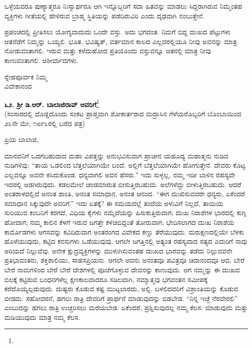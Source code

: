 ಒಳ್ಳೆಯವರೂ ಪುಣ್ಯಾತ್ಮರೂ ನಿಃಸ್ವಾರ್ಥರೂ ಆಗಿ ಇನ್ನೊಬ್ಬರಿಗೆ ಸದಾ ಹಿತವನ್ನು ಮಾಡಲು ಸಿದ್ದರಾಗಿರುವ ನಿಮ್ಮಂತಹ ವ್ಯಕ್ತಿಗಳು ಗೀತೆಯಲ್ಲಿ ಹೇಳಿರುವ ಬ್ರಾಹ್ಮ ಸ್ಥಿತಿಯನ್ನು ಪಡೆದಿರುವಿರಿ ಎಂದು ದೃಢವಾಗಿ ನಂಬುತ್ತೇನೆ.

ಪ್ರಪಂಚದಲ್ಲಿ ಪ್ರೀತಿಸಲು ಯೋಗ್ಯವಾದುದು ಒಂದೇ ವಸ್ತು. ಅದು ಭಗವಂತ. ನಿಮಗೆ ಬಿದ್ದ ದುಃಖದ ಪೆಟ್ಟುಗಳು ಆತನೆಡೆಗೆ ನಿಮ್ಮನ್ನು ಒಯ್ಯಲಿ. ಭೂತ, ಭವಿಷ್ಯತ್, ವರ್ತಮಾನ ಕಾಲದ ಎಲ್ಲದರಲ್ಲಿಯೂ ನೀವು ಅವನನ್ನು ಮಾತ್ರ ನೋಡುವಂತಾಗಲಿ. ಇರುವ ಮತ್ತು ಕಳೆದುಹೋದ ಪ್ರತಿಯೊಂದು ವಸ್ತುವನ್ನೂ ಆತನಲ್ಲಿ ಮಾತ್ರ ನೀವು ಕಾಣುವಂತಾಗಲಿ. ಆಶೀರ್ವಾದಗಳು.

{\flushright
ಸ್ನೇಹಪೂರ್ವಕ ನಿಮ್ಮ\\ವಿವೇಕಾನಂದ\par}

\newpage

\begin{center}
\textbf{೬೨. ಶ‍್ರೀ ಡಿ.ಆರ್. ಬಾಲಾಜಿರಾವ್ ಅವರಿಗೆ}\footnote{}\\ (ಸಂಸಾರದಲ್ಲಿ ದೊಡ್ಡದೊಂದು ಸಂಕಟ ಪ್ರಾಪ್ತವಾಗಿ ಶೋಕಾರ್ತರಾದ ಮದ್ರಾಸಿನ ಗೆಳೆಯರೊಬ್ಬರಿಗೆ ಬೊಂಬಾಯಿಂದ ೨೩ನೇ ಮೇ, ೧೮೯೩ರಲ್ಲಿ ಬರೆದ ಪತ್ರ)
\end{center}

ಪ್ರಿಯ ಬಾಲಾಜಿ,

ಮಾನವನಿಗೆ ಒದಗಬಹುದಾದ ಮಹಾ ವಿಪತ್ತನ್ನು ಅನುಭವಿಸುವಾಗ ಪ್ರಾಚೀನ ಯಹೂದ್ಯ ಮಹಾತ್ಮನು ನುಡಿದ ನುಡಿಗಳಿವು: ``ತಾಯ ಒಡಲಿಂದ ಬೆತ್ತಲೆಯಾಗಿಯೇ ಬಂದೆ. ಅಲ್ಲಿಗೆ ಬೆತ್ತಲೆಯಾಗಿಯೇ ಹೋಗುತ್ತೇನೆ. ದೇವರು ಕೊಟ್ಟ ಎಲ್ಲವನ್ನೂ ಅವನೇ ಕಸಿದುಕೊಂಡ. ಧನ್ಯವಾಗಲಿ ಅವನ ಹೆಸರು." ಇದು ಸುಳ್ಳಲ್ಲ, ನಮ್ಮ ಇಡೀ ಬಾಳಿನ ರಹಸ್ಯವೇ ಇದರಲ್ಲಿ ಅಡಗಿರುವುದು. ಕಡಲಮೇಲೆ ಚಂಡಮಾರುತ ಬೀಸುತ್ತಿರಬಹುದು. ಅಲೆಗಳೆದ್ದು ಬೀಳುತ್ತಿರಬಹುದು. ಆದರೆ ಅಂತರಾಳದಲ್ಲಿದೆ ಅನಂತ ಶಾಂತಿ, ಅನಂತ ಸಮಾಧಾನ, ಅನಂತ ಆನಂದ. ``ಈಗ ದುಃಖಿಸುವವರೇ ಧನ್ಯರು, ಏಕೆಂದರೆ ಸಮಾಧಾನ ಸಿಕ್ಕುವುದೇ ಅವರಿಗೆ.'' ಇದು ಏತಕ್ಕೆ? ಈ ಸಮಯದಲ್ಲೆ \enginline{-} ತಂದೆಯ ಅಳುವಿಗೆ ನಿಲ್ಲದೆ, ತಾಯಿಯ ಸುರಿಯುವ ಕಂಬನಿಗೆ ಕರಗದೆ, ವಿಧಿಯ ಕೈಗಳು ನಮ್ಮೆದೆಯನ್ನು ಹಿಸುಕುತ್ತಿರುವಾಗ; ದುಃಖ ನಿರಾಶೆಗಳ ಭಾರದಲ್ಲಿ ಕುಗ್ಗಿ ಹೋದಾಗ; ನಮ್ಮ ಕಾಲಿನ ಕೆಳಗೆ ಇರುವ ಜಗತ್ತೇ ಕಳಚಿಬಿದ್ದಂತೆ ತೋರುವಾಗ; ಭೇದಿಸಲಾಗದ ದುಃಖ ನಿರಾಶೆಯ ಕಾರ್ಮೊಡಗಳು ಆಗಸವನ್ನು ಕವಿದಿರುವಾಗ \enginline{-} ಅಂತರಂಗದ ವಿವೇಕದ ಕಣ್ಣು ತೆರೆಯುವುದು. ಮರುಕ್ಷಣದಲ್ಲಿಯೇ ಬೆಳಕು ಹೊಳೆಯುವುದು, ಕಟ್ಟಿದ ಕನಸುಗಳು ಒಡೆಯುವುವು. ಆಗಲೇ ಜಗತ್ತಿನಲ್ಲಿ ಅತ್ಯಂತ ರಹಸ್ಯವಾದ ಸತ್ಯದ ಎದುರಿಗೆ ನಾವು ಅರಿಯದೆ ನಿಲ್ಲುವೆವು. ಅನೇಕ ಕ್ಷುದ್ರವ್ಯಕ್ತಿಗಳನ್ನು ಮುಳುಗಿಸುವಂತಹ ದುಃಖದ ಭಾರವನ್ನು ತಡೆದು ನಿಲ್ಲುವವನೇ ಪ್ರತಿಭಾವಂತನು, ಶಕ್ತಿಶಾಲಿಯು, ಸಾಹಸಪ್ರಿಯನು. ಆಗಲೇ ಅವನು ಅನಂತವೂ ಪವಿತ್ರವೂ ಚಿದಾನಂದವೂ ಆದ, ಬೇರೆ ಬೇರೆ ನಾಮಗಳಿಂದ ಬೇರೆ ಬೇರೆ ದೇಶಗಳಲ್ಲಿ ಪೂಜೆಗೊಳ್ಳುವ ದೇವನನ್ನು ಕಾಣುವುದು. ಆಗ ನಮ್ಮನ್ನು ಈ ದುಃಖದ ಬಿಲಕ್ಕೆ ಕಟ್ಟಿರುವ ಬಂಧನಗಳೆಲ್ಲ ಕ್ಷಣಕಾಲವಾದರೂ ಸಡಿಲವಾಗಿ, ನಮ್ಮಾತ್ಮವು ಭಗವಂತನ ಸಮೀಪಕ್ಕೆ ಕರೆದೊಯ್ಯಲ್ಪಡುವುದು. ದುಷ್ಟರು ಕೊಡುವ ಕಷ್ಟ ಮುಟ್ಟಲಾರದು, ಅಲ್ಲಿ. ಬಳಲಿದವರಿಗೆ ವಿಶ್ರಾಂತಿಯನ್ನು ಕೊಡುವ ಬೀಡದು. ಸಹೋದರನೆ, ಹಗಲು ರಾತ್ರಿ ದೇವರಿಗೆ ಪ್ರಾರ್ಥನೆ ಮಾಡುವುದನ್ನು ಬಿಡಬೇಡ. “ನಿನ್ನ ಇಚ್ಛೆ ನೆರವೇರಲಿ” ಎಂಬುದನ್ನು ಹಗಲು ರಾತ್ರಿ ಉಚ್ಚರಿಸಲು ಮರೆಯಬೇಡ. ಏಕೆಂದರೆ, ಪ್ರಶ್ನಿಸುವುದಲ್ಲ ನಮ್ಮ ಕೆಲಸ: ಮಾಡುವುದು ಮತ್ತು ಮಡಿಯುವುದು ಮಾತ್ರ ನಮ್ಮ ಕೆಲಸ.

